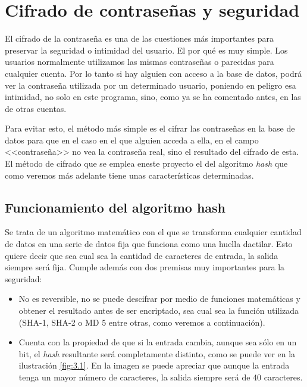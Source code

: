 \section{Cifrado de contraseñas y seguridad}

El cifrado de la contraseña es una de las cuestiones más importantes para preservar la seguridad o intimidad del usuario. El por qué es muy simple. Los usuarios normalmente utilizamos las mismas contraseñas o parecidas para cualquier cuenta. Por lo tanto si hay alguien con acceso a la base de datos, podrá ver la contraseña utilizada por un determinado usuario, poniendo en peligro esa intimidad, no solo en este programa, sino, como ya se ha comentado antes, en las de otras cuentas.

Para evitar esto, el método más simple es el cifrar las contraseñas en la base de datos para que en el caso en el que alguien acceda a ella, en el campo <<contraseña>> no vea la contraseña real, sino el resultado del cifrado de esta. El método de cifrado que se emplea eneste proyecto el del algoritmo \emph{hash} que como veremos más adelante tiene unas características determinadas. 

\subsection{Funcionamiento del algoritmo hash}

Se trata de un algoritmo matemático con el que se transforma cualquier cantidad de datos en una serie de datos fija que funciona como una huella dactilar. Esto quiere decir que sea cual sea la cantidad de caracteres de entrada, la salida siempre será fija. Cumple además con dos premisas muy importantes para la seguridad: 

\begin{itemize}
\item No es reversible, no se puede descifrar por medio de funciones matemáticas y obtener el resultado antes de ser encriptado, sea cual sea la función utilizada (SHA-1, SHA-2 o MD 5 entre otras, como veremos a continuación).
\item Cuenta con la propiedad de que si la entrada cambia, aunque sea sólo en un bit, el \emph{hash} resultante será completamente distinto, como se puede ver en la ilustración \ref{fig:3.1}. En la imagen se puede apreciar que aunque la entrada tenga un mayor número de caracteres, la salida siempre será de 40 caracteres.

\end{itemize} 

